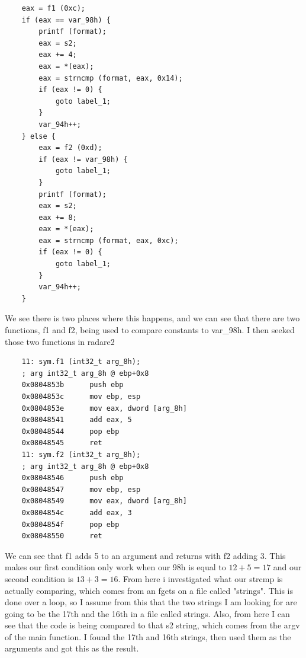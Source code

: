 \documentclass[11pt]{article}
\begin{document}
\begin{lstlisting}
    eax = f1 (0xc);
    if (eax == var_98h) {
        printf (format);
        eax = s2;
        eax += 4;
        eax = *(eax);
        eax = strncmp (format, eax, 0x14);
        if (eax != 0) {
            goto label_1;
        }
        var_94h++;
    } else {
        eax = f2 (0xd);
        if (eax != var_98h) {
            goto label_1;
        }
        printf (format);
        eax = s2;
        eax += 8;
        eax = *(eax);
        eax = strncmp (format, eax, 0xc);
        if (eax != 0) {
            goto label_1;
        }
        var_94h++;
    }
\end{lstlisting}

We see there is two places where this happens, and we can see that there are two functions, f1 and f2, being used to compare constants to var\_98h. I then seeked those two functions in radare2


\begin{lstlisting}
    11: sym.f1 (int32_t arg_8h);
    ; arg int32_t arg_8h @ ebp+0x8
    0x0804853b      push ebp
    0x0804853c      mov ebp, esp
    0x0804853e      mov eax, dword [arg_8h]
    0x08048541      add eax, 5
    0x08048544      pop ebp
    0x08048545      ret
    11: sym.f2 (int32_t arg_8h);
    ; arg int32_t arg_8h @ ebp+0x8
    0x08048546      push ebp
    0x08048547      mov ebp, esp
    0x08048549      mov eax, dword [arg_8h]
    0x0804854c      add eax, 3
    0x0804854f      pop ebp
    0x08048550      ret
\end{lstlisting}

We can see that f1 adds 5 to an argument and returns with f2 adding 3. This makes our first condition only work when our 98h is equal to $12 + 5 = 17$ and our second condition is $13 + 3 = 16$. From here i investigated what our strcmp is actually comparing, which comes from an fgets on a file called "strings". This is done over a loop, so I assume from this that the two strings I am looking for are going to be the 17th and the 16th in a file called strings. Also, from here I can see that the code is being compared to that s2 string, which comes from the argv of the main function. I found the 17th and 16th strings, then used them as the arguments and got this as the result.
\end{document}
